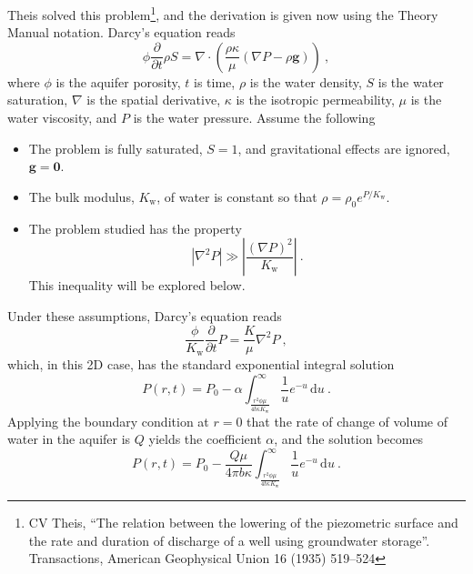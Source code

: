 \documentclass[]{scrreprt}
\begin{document}
Theis solved this problem\footnote{CV Theis, ``The relation between
  the lowering of the piezometric surface and the rate and duration of
  discharge of a well using groundwater storage''.  Transactions,
  American Geophysical Union 16 (1935) 519--524}, and the derivation
is given now using the Theory Manual notation.  Darcy's equation reads
\begin{equation}
\phi \frac{\partial}{\partial t} \rho S = \nabla\cdot \left(\frac{\rho
  \kappa}{\mu} (\nabla P - \rho {\mathbf{g}}) \right) \ ,
\end{equation}
where $\phi$ is the aquifer porosity, $t$ is time, $\rho$ is the water
density, $S$ is the water saturation, $\nabla$ is the spatial
derivative, $\kappa$ is the isotropic permeability, $\mu$ is the water
viscosity, and $P$ is the water pressure.  Assume the following
\begin{itemize}
\item The problem is fully saturated, $S=1$, and gravitational
  effects are ignored, ${\mathbf{g}} = {\mathbf{0}}$.
\item The bulk modulus, $K_{\mathrm{w}}$, of water is constant so that
  $\rho = \rho_{0}e^{P/K_{\mathrm{w}}}$.
\item The problem studied has the property
\begin{equation}
\left| \nabla^{2}P \right| \gg \left|\frac{(\nabla
  P)^{2}}{K_{\mathrm{w}}} \right|  \ .
\label{assumption.eqn}
\end{equation}
This inequality will be explored below.
\end{itemize}
\noindent Under these assumptions, Darcy's equation reads
\begin{equation}
\frac{\phi}{K_{\mathrm{w}}} \frac{\partial}{\partial t}P =
\frac{K}{\mu}\nabla^{2}P \ ,
\end{equation}
which, in this 2D case, has the standard exponential integral solution
\begin{equation}
P(r,t) = P_{0} - \alpha \int_{\frac{r^{2}\phi\mu}{4 t \kappa
    K_{\mathrm{w}}}}^{\infty} \frac{1}{u} e^{-u}\,\mathrm{d} u \ .
\end{equation}
Applying the boundary condition at $r=0$ that the rate of change of
volume of water in the aquifer is $Q$ yields the coefficient $\alpha$,
and the solution becomes
\begin{equation}
P(r,t) = P_{0} - \frac{Q\mu}{4\pi b \kappa} \int_{\frac{r^{2}\phi\mu}{4 t \kappa
    K_{\mathrm{w}}}}^{\infty} \frac{1}{u} e^{-u}\,\mathrm{d} u \ .
\label{eqn.theis}
\end{equation}
\end{document}

